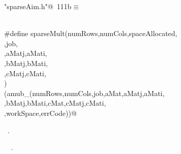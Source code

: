 \documentclass{article}
\begin{document}
\begin{description}
\begin{flushleft}
\begin{minipage}{\linewidth}
\begin{list}{}{\setlength{\itemsep}{-\parsep}\setlength{\itemindent}{-\leftmargin}}
\end{list}
\end{minipage}\vspace{4ex}
\end{flushleft}
\item[ C=A*B]
\begin{flushleft} \small
\begin{minipage}{\linewidth}\label{scrap195}\raggedright\small
{} \verb@"sparseAim.h"@\nobreak\ {\footnotesize {111b}}$\equiv$
\vspace{-1ex}
\begin{list}{}{} \item
\mbox{}\verb@@\\
\mbox{}\verb@#define sparseMult(numRows,numCols,spaceAllocated, \@\\
\mbox{}\verb@workSpace,job, \@\\
\mbox{}\verb@aMat,aMatj,aMati, \@\\
\mbox{}\verb@bMat,bMatj,bMati, \@\\
\mbox{}\verb@cMat,cMatj,cMati, \@\\
\mbox{}\verb@errCode) \@\\
\mbox{}\verb@(amub_(numRows,numCols,job,aMat,aMatj,aMati, \@\\
\mbox{}\verb@bMat,bMatj,bMati,cMat,cMatj,cMati, \@\\
\mbox{}\verb@spaceAllocated,workSpace,errCode))@\\
\mbox{}\verb@@{\NWsep}
\end{list}
\vspace{-1.5ex}
\footnotesize
\begin{list}{}{\setlength{\itemsep}{-\parsep}\setlength{\itemindent}{-\leftmargin}}
\item \NWtxtFileDefBy\ .
\item \NWtxtIdentsUsed\nobreak\  \verb@job@\nobreak\ .
\item{}
\end{list}

\end{minipage}
\end{flushleft}
\end{description}
\end{document}
